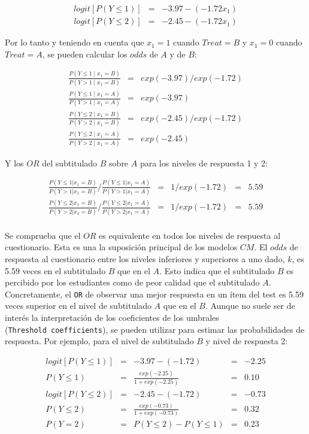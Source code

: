 \documentclass[
  12pt,
  a4paper,
  extrafontsizes,
  onecolumn,
  openright,
  table]{memoir}
\begin{document}
\[
\begin{aligned}
logit [P(Y \le 1)] & = & -3.97 - (-1.72 x_1) \\
logit [P(Y \le 2)] & = & -2.45 - (-1.72 x_1)
\end{aligned}
\]

Por lo tanto y teniendo en cuenta que \(x_1 = 1\) cuando \(Treat = B\) y
\(x_1 = 0\) cuando \(Treat = A\), se pueden calcular los \(odds\) de
\(A\) y de \(B\):

\[
\begin{aligned}
\frac{P(Y \le 1 \mid x_1 = B)}{P(Y > 1 \mid x_1 = B)} & = & exp(-3.97)/exp(-1.72) \\
\frac{P(Y \le 1 \mid x_1 = A)}{P(Y > 1 \mid x_1 = A)} & = & exp(-3.97) \\
\frac{P(Y \le 2 \mid x_1 = B)}{P(Y > 2 \mid x_1 = B)} & = & exp(-2.45)/exp(-1.72) \\
\frac{P(Y \le 2 \mid x_1 = A)}{P(Y > 2 \mid x_1 = A)} & = & exp(-2.45)
\end{aligned}
\]

Y los \(OR\) del subtitulado \(B\) sobre \(A\) para los niveles de
respuesta 1 y 2:

\[
\begin{aligned}
\frac{P(Y \le 1 | x_1=B)}{P(Y > 1 | x_1=B)} / \frac{P(Y \le 1 | x_1=A)}{P(Y > 1 | x_1=A)} & = & 1/exp(-1.72) & = & 5.59 \\
\frac{P(Y \le 2 | x_1=B)}{P(Y > 2 | x_1=B)} / \frac{P(Y \le 2 | x_1=A)}{P(Y > 2 | x_1=A)} & = & 1/exp(-1.72) & = & 5.59 \\
\end{aligned}
\]

Se comprueba que el \(OR\) es equivalente en todos los niveles de
respuesta al cuestionario. Esta es una la suposición principal de los
modelos \(CM\). El \(odds\) de respuesta al cuestionario entre los
niveles inferiores y superiores a uno dado, \(k\), es 5.59 veces en el
subtitulado \(B\) que en el \(A\). Esto indica que el subtitulado \(B\)
es percibido por los estudiantes como de peor calidad que el subtitulado
\(A\). Concretamente, el \texttt{OR} de observar una mejor respuesta en
un ítem del test es 5.59 veces superior en el nivel de subtitulado \(A\)
que en el \(B\). Aunque no suele ser de interés la interpretación de los
coeficientes de los umbrales (\texttt{Threshold\ coefficients}), se
pueden utilizar para estimar las probabilidades de respuesta. Por
ejemplo, para el nivel de subtitulado \(B\) y nivel de respuesta 2:

\[
\begin{aligned}
logit [P(Y \le 1)] & = & -3.97 - (-1.72) & = & -2.25 \\
P(Y \le 1) & = & \frac{exp(-2.25)}{1 + exp(-2.25)} & = & 0.10 \\
logit [P(Y \le 2)] & = & -2.45 - (-1.72) & = & -0.73 \\
P(Y \le 2) & = & \frac{exp(-0.73)}{1 + exp(-0.73)} & = & 0.32 \\
P(Y = 2) & = & P(Y \le 2) - P(Y \le 1) & = &  0.23 
\end{aligned}
\]
\end{document}
